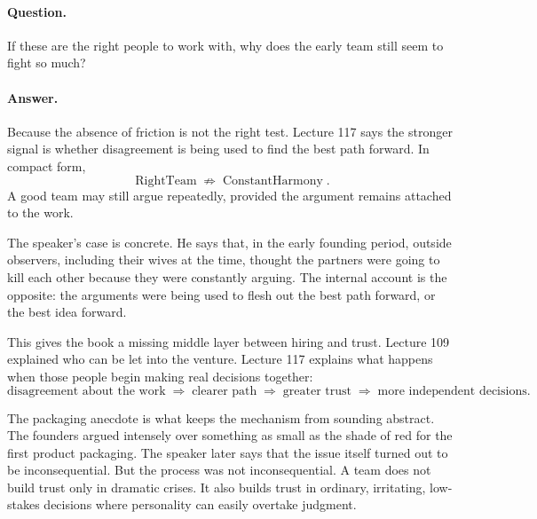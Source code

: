 \documentclass[11pt,oneside]{book}
\begin{document}
\paragraph{Question.}
If these are the right people to work with, why does the early team still seem to fight so much?

\paragraph{Answer.}
Because the absence of friction is not the right test. Lecture 117 says the stronger signal is whether disagreement is being used to find the best path forward. In compact form,
\[
\operatorname{RightTeam}
\nRightarrow
\operatorname{ConstantHarmony}.
\]
A good team may still argue repeatedly, provided the argument remains attached to the work.

The speaker's case is concrete. He says that, in the early founding period, outside observers, including their wives at the time, thought the partners were going to kill each other because they were constantly arguing. The internal account is the opposite: the arguments were being used to flesh out the best path forward, or the best idea forward.

This gives the book a missing middle layer between hiring and trust. Lecture 109 explained who can be let into the venture. Lecture 117 explains what happens when those people begin making real decisions together:
\[
\text{disagreement about the work}
\;\Rightarrow\;
\text{clearer path}
\;\Rightarrow\;
\text{greater trust}
\;\Rightarrow\;
\text{more independent decisions}.
\]

The packaging anecdote is what keeps the mechanism from sounding abstract. The founders argued intensely over something as small as the shade of red for the first product packaging. The speaker later says that the issue itself turned out to be inconsequential. But the process was not inconsequential. A team does not build trust only in dramatic crises. It also builds trust in ordinary, irritating, low-stakes decisions where personality can easily overtake judgment.
\end{document}
